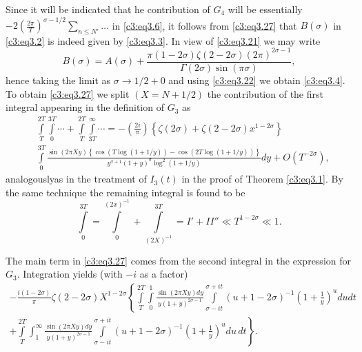 Since it will be indicated that he contribution of $G_4$ will be
essentially $-2 \left(\frac{2 \pi}{T} \right)^{\sigma - 1/2}
\sum\limits_{n \leq N'}\ldots$ in \eqref{c3:eq3.6}, it follows from
\eqref{c3:eq3.27} that $B(\sigma)$ in \eqref{c3:eq3.2} is indeed given
by \eqref{c3:eq3.3}. In view of \eqref{c3:eq3.21} we may write
$$
B(\sigma) = A(\sigma) + \frac{\pi (1- 2 \sigma)\zeta (2 - 2 \sigma)(2
  \pi)^{2 \sigma-1}}{\Gamma (2 \sigma)\sin (\pi \sigma)},
$$ 
hence taking the limit as $\sigma \to 1/2 + 0$ and using
\eqref{c3:eq3.22} we obtain \eqref{c3:eq3.4}. To obtain
\eqref{c3:eq3.27} we split $(X= N + 1/2)$ the contribution of the
first integral appearing in the definition of $G_3$ as 
{\fontsize{10}{12}\selectfont
\begin{align*}
&  \int\limits_T^{2T} \int\limits_0^{3T} \cdots + \int\limits_T^{2T}
  \int\limits_{3T}^\infty \cdots = - \left(\frac{2i}{\pi} \right)
  \left\{\zeta (2 \sigma)+ \zeta (2 - 2 \sigma)x^{1- 2 \sigma}
  \right\}\\
&  \int\limits_0^{3T} \frac{\sin (2 \pi X y) \left\{\cos (T \log (1+
    1/y)) - \cos (2 T \log (1+ 1/y)) \right\}}{y^{\sigma+1} (1+
    y)^{\sigma} \log^2 (1+ 1/y)} dy  + O(T^{-2\sigma}),
\end{align*}}
analogously\pageoriginale as in the treatment of $I_3 (t)$ in the
proof of Theorem \eqref{c3:eq3.1}. By the same technique the remaining
integral is found to be
$$
\int\limits_0^{3T} = \int\limits_0^{(2x)^{-1}} + \int\limits_{(2
  X)^{-1}}^{3T} = I' + II'' \ll T^{1-2 \sigma} \ll 1.
$$ 

The main term in \eqref{c3:eq3.27} comes from the second integral in
the expression for $G_3$. Integration yields (with $-i$ as a factor) 
{\fontsize{8}{10}\selectfont
\begin{multline*}
  - \frac{i(1- 2 \sigma)}{\pi} \zeta (2 - 2 \sigma)X^{1- 2 \sigma}
  \left\{ \int\limits_T^{2T} \int\limits_0^1 \frac{\sin (2 \pi
    Xy)dy}{y(1+y)^{2 \sigma-1}} \int\limits_{\sigma - it}^{\sigma+ it}
  (u+1- 2 \sigma)^{-1} \left(1 + \frac{1}{y}\right)^u du dt \right.\\
  \left.+\int\limits_T^{2T} \int_1^\infty \frac{\sin(2 \pi Xy)dy}{y (1+
    y)^{2 \sigma-1}} \int\limits_{\sigma - it}^{\sigma + it} (u+1 - 2
  \sigma)^{-1} \left(1+ \frac{1}{y} \right)^u du \, dt \right\}.
\end{multline*}}

